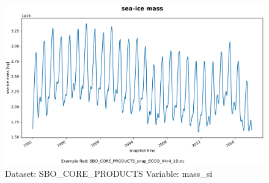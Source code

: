 \begin{figure}[H]
\centering
\includegraphics[width=\textwidth]{../images/plots/oneD_plots/SBO_Core_Products/mass_si.png}
\caption{Dataset: SBO\_CORE\_PRODUCTS Variable: mass\_si}
\label{tab:table-SBO_CORE_PRODUCTS_mass_si-Plot}
\end{figure}
\pagebreak
